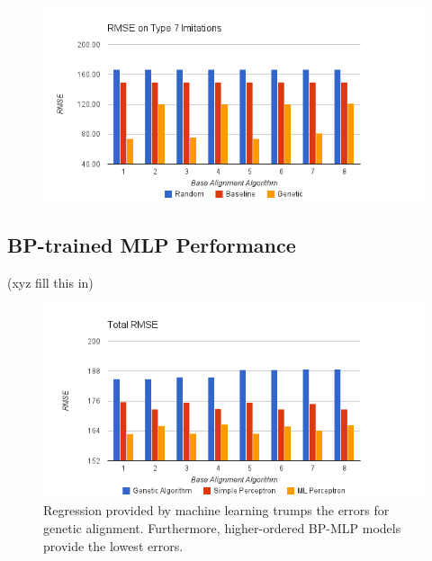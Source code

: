 \begin{figure}[center]
	\centering
	\includegraphics[width=16cm]{images/chart5.png}
	\caption{}
	\label{fig:c7}
\end{figure}


\subsection{BP-trained MLP Performance}
(xyz fill this in)

\begin{figure}[center]
	\centering
	\includegraphics[width=16cm]{images/chart4.png}
	\caption{Regression provided by machine learning trumps the errors for genetic alignment. Furthermore, higher-ordered BP-MLP models provide the lowest errors.}
	\label{fig:overall_ml}
\end{figure}

